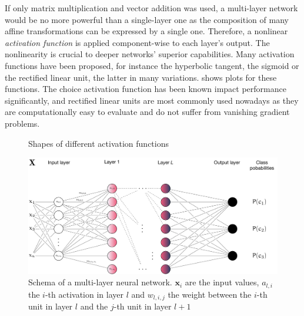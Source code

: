 If only matrix multiplication and vector addition was used, a multi-layer network would be no more
powerful than a single-layer one as the composition of many affine
transformations can be expressed by a single one. Therefore, a nonlinear
\emph{activation function} is applied component-wise to each layer's output. The
nonlinearity is crucial to deeper networks' superior capabilities. Many
activation functions have been proposed, for instance the hyperbolic tangent,
the sigmoid or the rectified linear unit, the latter in many variations.
 shows plots for these functions. The
choice activation function has been known impact performance significantly, and
rectified linear units are most commonly used nowadays as they are
computationally easy to evaluate and do not suffer from vanishing gradient
problems.

\begin{figure}
    \centering
    \caption{Shapes of different activation functions}
    \label{fig:activation_functions}
\end{figure}

\begin{figure}
    \centering
    \includegraphics[max width=\textwidth]{gfx/diagrams/neural_network/neural_net.pdf}
    \caption[Schema of a multi-layer neural network]{Schema of a multi-layer neural network. \(\mathbf{x}_i\) are
        the input values, \(a_{l,i}\) the \(i\)-th activation in layer \(l\)
        and \(w_{l,i,j}\) the weight between the \(i\)-th unit in layer
    \(l\) and the \(j\)-th unit in layer \(l+1\)}
    \label{fig:neuralnet}
\end{figure}

